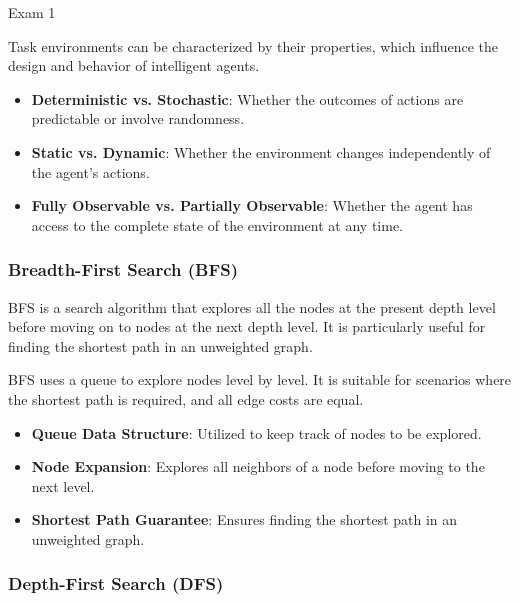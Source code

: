 \begin{examnotes}{Exam 1}
    \begin{highlight}
        Task environments can be characterized by their properties, which influence the design and behavior of intelligent agents.
        
        \begin{itemize}
            \item \textbf{Deterministic vs. Stochastic}: Whether the outcomes of actions are predictable or involve randomness.
            \item \textbf{Static vs. Dynamic}: Whether the environment changes independently of the agent's actions.
            \item \textbf{Fully Observable vs. Partially Observable}: Whether the agent has access to the complete state of the environment at any time.
        \end{itemize}
    \end{highlight}
    
    \subsubsection*{Breadth-First Search (BFS)}
    
    BFS is a search algorithm that explores all the nodes at the present depth level before moving on to nodes at the next depth level. It is particularly useful for finding the shortest path in an unweighted graph.
    
    \begin{highlight}
        BFS uses a queue to explore nodes level by level. It is suitable for scenarios where the shortest path is required, and all edge costs are equal.
        
        \begin{itemize}
            \item \textbf{Queue Data Structure}: Utilized to keep track of nodes to be explored.
            \item \textbf{Node Expansion}: Explores all neighbors of a node before moving to the next level.
            \item \textbf{Shortest Path Guarantee}: Ensures finding the shortest path in an unweighted graph.
        \end{itemize}
    \end{highlight}
    
    \subsubsection*{Depth-First Search (DFS)}
    

\end{examnotes}
